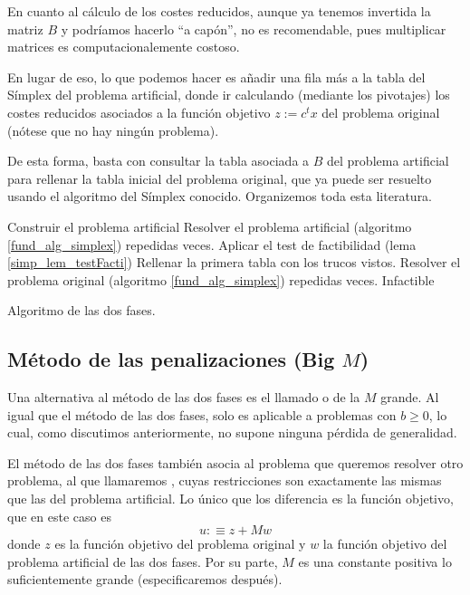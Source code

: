 En cuanto al cálculo de los costes reducidos, aunque ya tenemos invertida la matriz $B$ y podríamos hacerlo ``a capón'', no es recomendable, pues multiplicar matrices es computacionalemente costoso.

En lugar de eso, lo que podemos hacer es añadir una fila más a la tabla del Símplex del problema artificial, donde ir calculando (mediante los pivotajes) los costes reducidos asociados a la función objetivo $z:=c^tx$ del problema original (nótese que no hay ningún problema).

De esta forma, basta con consultar la tabla asociada a $B$ del problema artificial para rellenar la tabla inicial del problema original, que ya puede ser resuelto usando el algoritmo del Símplex conocido. Organizemos toda esta literatura.
\begin{algorithm}[H]
	\begin{algorithmic}[1]
		\STATE{}
			\STATE Construir el problema artificial
			\STATE Resolver el problema artificial (algoritmo \ref{fund_alg_simplex}) repedidas veces.
			\STATE Aplicar el test de factibilidad (lema \ref{simp_lem_testFacti})
				\STATE{}
				\STATE Rellenar la primera tabla con los trucos vistos.
				\STATE Resolver el problema original (algoritmo \ref{fund_alg_simplex}) repedidas veces.
			\ELSE
				\RETURN Infactible
			\ENDIF
	\end{algorithmic}
	\caption{Algoritmo de las dos fases.}\label{simp_alg_dosFases}
\end{algorithm}
\subsection{Método de las penalizaciones (Big $M$)}
Una alternativa al método de las dos fases es el llamado  o de la $M$ grande. Al igual que el método de las dos fases, solo es aplicable a problemas con $b\geq 0$, lo cual, como discutimos anteriormente, no supone ninguna pérdida de generalidad.

El método de las dos fases también asocia al problema que queremos resolver otro problema, al que llamaremos , cuyas restricciones son exactamente las mismas que las del problema artificial. Lo único que los diferencia es la función objetivo, que en este caso es
\begin{equation*}
	u:\equiv z+Mw
\end{equation*}
donde $z$ es la función objetivo del problema original y $w$ la función objetivo del problema artificial de las dos fases. Por su parte, $M$ es una constante positiva lo suficientemente grande (especificaremos después).

